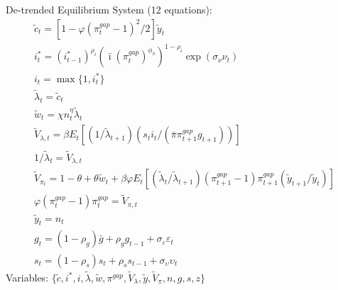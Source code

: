 \documentclass[12pt, final]{article}
\begin{document}
\setcounter{equation}{0}
\noindent De-trended Equilibrium System (12 equations):
\small\begin{gather}
\tilde{c}_t = [1-\varphi(\pi_t^{gap} - 1)^2/2]\tilde{y}_t\\
i_t^*=(i^*_{t-1})^{\rho_i}(\bar{\imath}(\pi_t^{gap})^{\phi_\pi})^{1-\rho_i}\exp(\sigma_\nu\nu_t)\\
i_t=\max\{1,i_t^*\}\\
\tilde{\lambda}_t = \tilde{c}_t\\
\tilde{w}_t = \chi n_t^\eta \tilde{\lambda}_t  \\
\tilde{V}_{\lambda,t} = \beta E_t[(1/\tilde{\lambda}_{t+1})(s_ti_t/(\bar{\pi}\pi^{gap}_{t+1}g_{t+1}))]\\%
1/\tilde{\lambda}_t = \tilde{V}_{\lambda,t}\\%
\tilde{V}_{\pi_t} = 1 - \theta + \theta\tilde{w}_t + \beta\varphi E_t[(\tilde{\lambda}_t/\tilde{\lambda}_{t+1})(\pi^{gap}_{t+1}-1)\pi^{gap}_{t+1}(\tilde{y}_{t+1}/\tilde{y}_t)]\\
\varphi(\pi_t^{gap}-1){\pi}_t^{gap} = \tilde{V}_{\pi,t}\\
  \tilde{y}_t= n_t\\  
  g_t= (1-\rho_g)\bar{g}+\rho_gg_{t-1} + \sigma_\varepsilon\varepsilon_t \\
  s_t=(1-\rho_s)s_t+\rho_ss_{t-1} + \sigma_\upsilon\upsilon_t
\end{gather}
Variables: $\{\tilde{c},i^*,i,\tilde{\lambda},\tilde{w},\pi^{gap},\tilde{V}_{\lambda},\tilde{y},\tilde{V}_{\pi},n,g,s,z\}$\\ 
\end{document}
